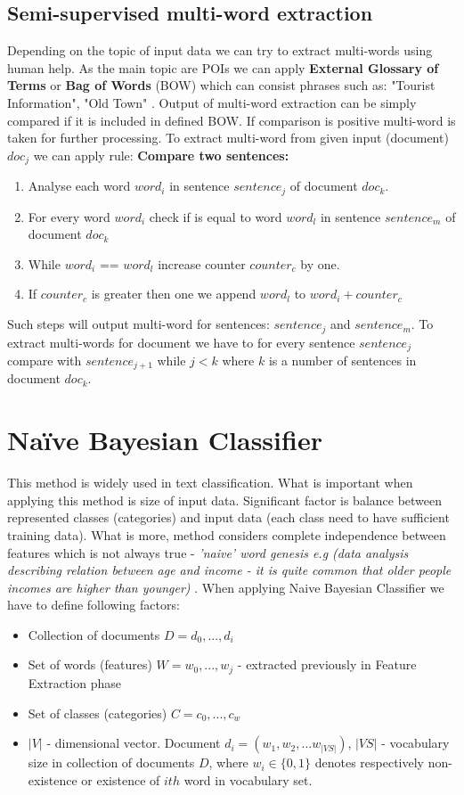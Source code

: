 \subsection{Semi-supervised multi-word extraction}
Depending on the topic of input data we can try to extract multi-words using human help. As the main topic are POIs we can apply \textbf{External Glossary of Terms} or \textbf{Bag of Words} (BOW) which can consist phrases such as: "Tourist Information", "Old Town" \cite{1}. Output of multi-word extraction can be simply compared if it is included in defined BOW. If comparison is positive multi-word is taken for further processing. To extract multi-word from given input (document) $doc_j$ we can apply rule:
\newline\textbf{Compare two sentences:}
\begin{enumerate}	
	\item Analyse each word $word_i$ in sentence $sentence_j$ of document $doc_k$.
	\item For every word $word_i$ check if is equal to word $word_l$ in sentence $sentence_m$ of document $doc_k$
	\item While $word_i$ == $word_l$ increase counter $counter_c$ by one. 
	\item If $counter_c$ is greater then one we append $word_l$ to $word_i + counter_c$ 
\end{enumerate}
Such steps will output multi-word for sentences: $sentence_j$ and $sentence_m$. To extract multi-words for document we have to for every sentence $sentence_j$ compare with $sentence_{j+1}$ while $j<k$ where $k$ is a number of sentences in document $doc_k$.

\section{Naïve Bayesian Classifier}
This method is widely used in text classification. What is important when applying this method is size of input data. Significant factor is balance between represented classes (categories) and input data (each class need to have sufficient training data). What is more, method considers complete independence between features which is not always true - \textit{'naive' word genesis e.g (data analysis describing relation between age and income  - it is quite common that older people incomes are higher than younger)} \cite{4}.
\newline When applying Naive Bayesian Classifier we have to define following factors:
\begin{itemize}
	\item Collection of documents $D = {d_0,...,d_i}$
	\item Set of words (features) $W = {w_0,...,w_j}$ - extracted previously in Feature Extraction phase
	\item Set of classes (categories) $C = {c_0,...,c_w}$
	\item $|V|$ - dimensional vector. Document $d_i = (w_1,w_2,...w_{|VS|})$, $|VS|$ - vocabulary size in collection of documents $D$, where $w_i\in\{0,1\}$ denotes respectively non-existence or existence of $ith$ word in vocabulary set.
\end{itemize}  
 
